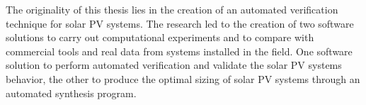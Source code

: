 
The originality of this thesis lies in the creation of an automated verification technique for solar PV systems. The research led to the creation of two software solutions to carry out computational experiments and to compare with commercial tools and real data from systems installed in the field. One software solution to perform automated verification and validate the solar PV systems behavior, the other to produce the optimal sizing of solar PV systems through an automated synthesis program.

